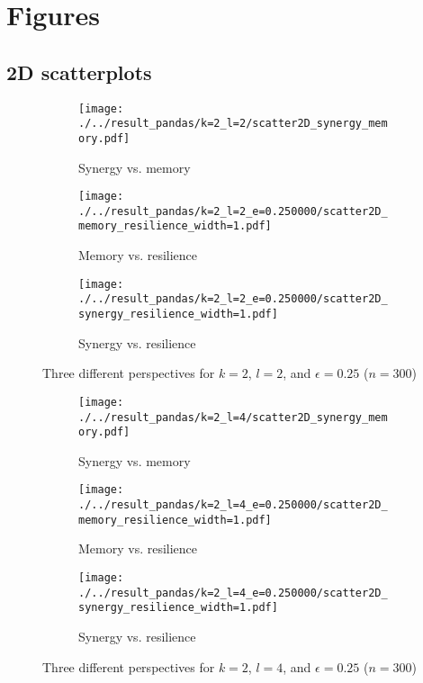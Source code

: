 \documentclass[../main.tex]{subfiles}
\begin{document}
\section{Figures}
\label{appendix_figures}

\subsection{2D scatterplots}

\begin{figure}[ht]
    \centering
    \begin{subfigure}[b]{0.3\textwidth}
        \texttt{[image: ./../result\_pandas/k=2\_l=2/scatter2D\_synergy\_memory.pdf]}
        \caption{Synergy vs. memory}
    \end{subfigure}
    \begin{subfigure}[b]{0.3\textwidth}
        \texttt{[image: ./../result\_pandas/k=2\_l=2\_e=0.250000/scatter2D\_memory\_resilience\_width=1.pdf]}
        \caption{Memory vs. resilience}
    \end{subfigure}
    \begin{subfigure}[b]{0.3\textwidth}
        \texttt{[image: ./../result\_pandas/k=2\_l=2\_e=0.250000/scatter2D\_synergy\_resilience\_width=1.pdf]}
        \caption{Synergy vs. resilience}
    \end{subfigure}
    \caption{Three different perspectives for $k=2$, $l=2$, and $\epsilon = 0.25$ ($n=300$)}
    \label{fig:2d22}
\end{figure}

\begin{figure}[ht]
    \centering
    \begin{subfigure}[b]{0.3\textwidth}
        \texttt{[image: ./../result\_pandas/k=2\_l=4/scatter2D\_synergy\_memory.pdf]}
        \caption{Synergy vs. memory}
    \end{subfigure}
    \begin{subfigure}[b]{0.3\textwidth}
        \texttt{[image: ./../result\_pandas/k=2\_l=4\_e=0.250000/scatter2D\_memory\_resilience\_width=1.pdf]}
        \caption{Memory vs. resilience}
    \end{subfigure}
    \begin{subfigure}[b]{0.3\textwidth}
        \texttt{[image: ./../result\_pandas/k=2\_l=4\_e=0.250000/scatter2D\_synergy\_resilience\_width=1.pdf]}
        \caption{Synergy vs. resilience}
    \end{subfigure}
    \caption{Three different perspectives for $k=2$, $l=4$, and $\epsilon = 0.25$ ($n=300$)}
    \label{fig:2d24}
\end{figure}
\end{document}
